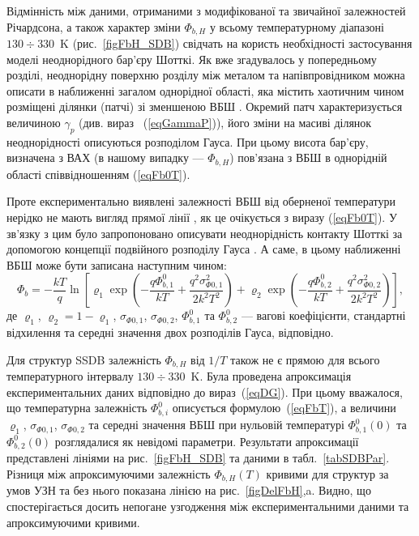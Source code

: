 Відмінність між даними, отриманими з модифікованої та звичайної залежностей Річардсона,
а також характер зміни $\Phi_{b,H}$ у всьому температурному діапазоні $130\div330$~K (рис.~\ref{figFbH_SDB})
свідчать на користь необхідності застосування моделі неоднорідного бар'єру Шотткі.
Як вже згадувалось у попередньому розділі,
неоднорідну поверхню розділу між металом та напівпровідником можна описати в наближенні загалом однорідної області,
яка містить хаотичним чином розміщені ділянки (патчі) зі зменшеною ВБШ \cite{Tung:PhysRev,Tung:MSE}.
Окремий патч характеризується величиною $\gamma_p$ (див. вираз ~(\ref{eqGammaP})),
його зміни на масиві ділянок неоднорідності описуються розподілом Гауса.
При цьому висота бар'єру, визначена з ВАХ (в нашому випадку --- $\Phi_{b,H}$) пов'язана з ВБШ в однорідній області співвідношенням (\ref{eqFb0T}).

Проте експериментально виявлені залежності ВБШ від оберненої температури нерідко не мають вигляд прямої лінії \cite{KumarJAP2012,Tascioglu2010,Jiang:DG,Yildirima:DG,Jiang:DGJap},
як це очікується з виразу (\ref{eqFb0T}).
У зв'язку з цим було запропоновано описувати неоднорідність контакту Шотткі за допомогою концепції подвійного розподілу Гауса \cite{Jiang:DG,Yildirima:DG,Jiang:DGJap}.
А саме, в цьому наближенні ВБШ може бути записана наступним чином:
\begin{equation}
\label{eqDG}
  \Phi_b=-\frac{kT}{q}\ln\left[\varrho_1\exp\left(-\frac{q\Phi_{b,1}^0}{kT}+
  \frac{q^2\sigma^2_{\Phi0,1}}{2k^2T^2}\right)
   +
  \varrho_2\exp\left(-\frac{q\Phi_{b,2}^{0}}{kT}+
  \frac{q^2\sigma^2_{\Phi0,2}}{2k^2T^2}\right)\right],
\end{equation}
де
$\varrho_1$, $\varrho_2=1-\varrho_1$, $\sigma_{\Phi0,1}$, $\sigma_{\Phi0,2}$, $\Phi_{b,1}^0$ та $\Phi_{b,2}^0$ ---
вагові коефіцієнти, стандартні відхилення та середні значення двох розподілів Гауса, відповідно.

Для структур SSDB залежність $\Phi_{b,H}$ від $1/T$ також не є прямою для всього температурного інтервалу $130\div330$~K.
Була проведена апроксимація експериментальних даних відповідно до вираз~(\ref{eqDG}).
При цьому вважалося, що температурна залежність $\Phi_{b,i}^0$ описується формулою~(\ref{eqFbT}), а величини
$\varrho_1$, $\sigma_{\Phi0,1}$, $\sigma_{\Phi0,2}$ та середні значення ВБШ при нульовій температурі $\Phi_{b,1}^0(0)$ та $\Phi_{b,2}^0(0)$
розглядалися як невідомі параметри.
Результати апроксимації представлені лініями на рис.~\ref{figFbH_SDB} та даними в табл.~\ref{tabSDBPar}.
Різниця між апроксимуючими залежність $\Phi_{b,H}(T)$ кривими для структур за умов УЗН та без нього
показана лінією на рис.~\ref{figDelFbH},a.
Видно, що спостерігається досить непогане узгодження між експериментальними даними та апроксимуючими кривими.

